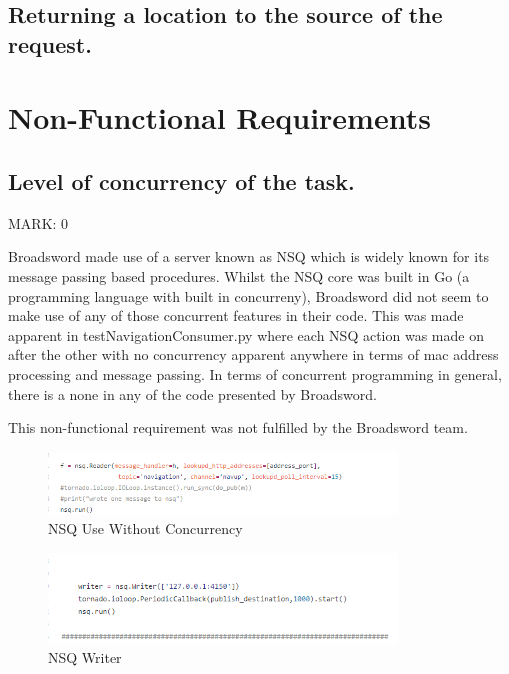 \documentclass{article}
\begin{document}
\subsection{Returning a location to the source of the request.}


\section{Non-Functional Requirements}

\subsection{Level of concurrency of the task.}
\begin{flushleft}MARK: 0\end{flushleft}
Broadsword made use of a server known as NSQ which is widely known for its message passing based procedures. Whilst the NSQ core was built in Go (a programming language with built in concurreny), Broadsword did not seem to make use of any of those concurrent features in their code. This was made apparent in testNavigationConsumer.py where each NSQ action was made on after the other with no concurrency apparent anywhere in terms of mac address processing and message passing. In terms of concurrent programming in general, there is a none in any of the code presented by Broadsword. 
\begin{flushleft}This non-functional requirement was not fulfilled by the Broadsword team.\end{flushleft}
\begin{figure}[ht]
  \includegraphics[width=350px]{Images/concurrency.PNG}
  \caption{NSQ Use Without Concurrency}
  \label{NSQ Use Without Concurrency}
\end{figure}
\begin{figure}[ht]
  \includegraphics[width=350px]{Images/concurrency2.PNG}
  \caption{NSQ Writer}
  \label{NSQ Writer}
\end{figure}
\end{document}
